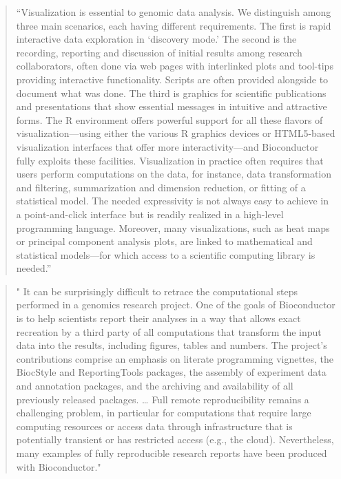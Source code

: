 \documentclass[]{tufte-book}
\begin{document}
\begin{quote}
``Visualization is essential to genomic data analysis. We distinguish among
three main scenarios, each having different requirements. The first is rapid
interactive data exploration in `discovery mode.' The second is the recording,
reporting and discussion of initial results among research collaborators, often
done via web pages with interlinked plots and tool-tips providing interactive
functionality. Scripts are often provided alongside to document what was done.
The third is graphics for scientific publications and presentations that show
essential messages in intuitive and attractive forms. The R environment offers
powerful support for all these flavors of visualization---using either the various
R graphics devices or HTML5-based visualization interfaces that offer more
interactivity---and Bioconductor fully exploits these facilities. Visualization
in practice often requires that users perform computations on the data, for
instance, data transformation and filtering, summarization and dimension
reduction, or fitting of a statistical model. The needed expressivity is not
always easy to achieve in a point-and-click interface but is readily realized in
a high-level programming language. Moreover, many visualizations, such as heat
maps or principal component analysis plots, are linked to mathematical and
statistical models---for which access to a scientific computing library is
needed.'' \citep{huber2015orchestrating}
\end{quote}

\begin{quote}
" It can be surprisingly difficult to retrace the computational steps
performed in a genomics research project. One of the goals of Bioconductor is to
help scientists report their analyses in a way that allows exact recreation by a
third party of all computations that transform the input data into the results,
including figures, tables and numbers. The project's contributions comprise an
emphasis on literate programming vignettes, the BiocStyle and ReportingTools
packages, the assembly of experiment data and annotation packages, and the
archiving and availability of all previously released packages. \ldots{} Full remote
reproducibility remains a challenging problem, in particular for computations
that require large computing resources or access data through infrastructure
that is potentially transient or has restricted access (e.g., the cloud).
Nevertheless, many examples of fully reproducible research reports have been
produced with Bioconductor." \citep{huber2015orchestrating}
\end{quote}
\end{document}
